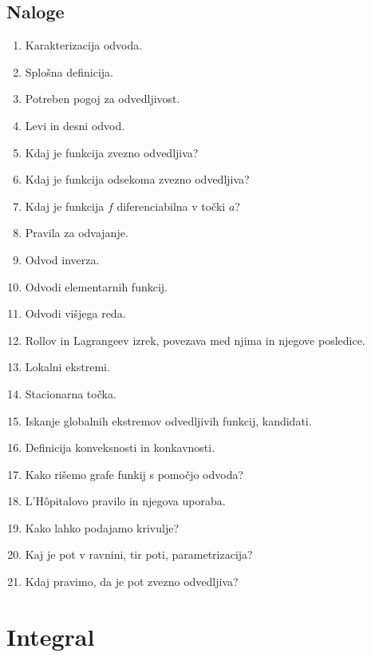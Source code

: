 \documentclass[a4paper,12pt]{report}
\begin{document}
\section*{Naloge}
\begin{enumerate}
    \item Karakterizacija odvoda.
    \item Splošna definicija.
    \item Potreben pogoj za odvedljivost.
    \item Levi in desni odvod.
    \item Kdaj je funkcija zvezno odvedljiva?
    \item Kdaj je funkcija odsekoma zvezno odvedljiva?
    \item Kdaj je funkcija $f$ diferenciabilna v točki $a$?
    \item Pravila za odvajanje.
    \item Odvod inverza.
    \item Odvodi elementarnih funkcij.
    \item Odvodi višjega reda.
    \item Rollov in Lagrangeev izrek, povezava med njima in njegove posledice.
    \item Lokalni ekstremi.
    \item Stacionarna točka.
    \item Iskanje globalnih ekstremov odvedljivih funkcij, kandidati.
    \item Definicija konveksnosti in konkavnosti.
    \item Kako rišemo grafe funkij s pomočjo odvoda?
    \item L'Hôpitalovo pravilo in njegova uporaba.
    \item Kako lahko podajamo krivulje?
    \item Kaj je pot v ravnini, tir poti, parametrizacija?
    \item Kdaj pravimo, da je pot zvezno odvedljiva?
\end{enumerate}




\chapter{Integral}
\end{document}
